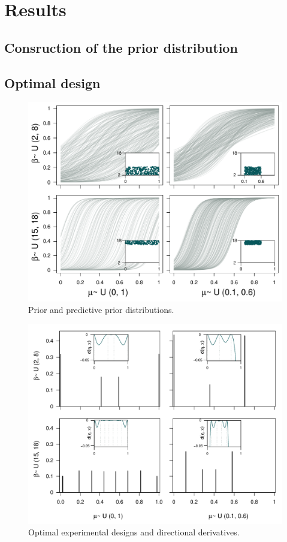 \documentclass[preprint,review,12pt]{elsarticle}
\begin{document}
\section{Results}
\label{S:3}

\subsection{Consruction of the prior distribution}


\subsection{Optimal design}

\begin{figure}
\includegraphics[width=\textwidth]{Prior_and_Predictive.pdf}
\caption{Prior and predictive prior distributions.}
\label{fig:ppd}
\end{figure}

\begin{figure}
\includegraphics[width=\textwidth]{Support_detadx.pdf}
\caption{Optimal experimental designs and directional derivatives.}
\label{fig:detadx}
\end{figure}
\end{document}

